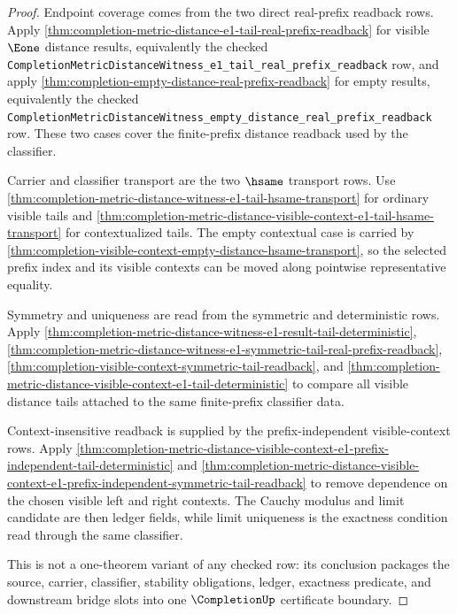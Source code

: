 \begin{proof}
Endpoint coverage comes from the two direct real-prefix readback rows. Apply
\autoref{thm:completion-metric-distance-e1-tail-real-prefix-readback} for visible
$\Eone$ distance results, equivalently the checked
\texttt{CompletionMetricDistanceWitness\_e1\_tail\_real\_prefix\_readback} row, and
apply \autoref{thm:completion-empty-distance-real-prefix-readback} for empty results,
equivalently the checked
\texttt{CompletionMetricDistanceWitness\_empty\_distance\_real\_prefix\_readback} row.
These two cases cover the finite-prefix distance readback used by the classifier.

Carrier and classifier transport are the two $\hsame$ transport rows. Use
\autoref{thm:completion-metric-distance-witness-e1-tail-hsame-transport} for ordinary
visible tails and \autoref{thm:completion-metric-distance-visible-context-e1-tail-hsame-transport}
for contextualized tails. The empty contextual case is carried by
\autoref{thm:completion-visible-context-empty-distance-hsame-transport}, so the selected
prefix index and its visible contexts can be moved along pointwise representative equality.

Symmetry and uniqueness are read from the symmetric and deterministic rows. Apply
\autoref{thm:completion-metric-distance-witness-e1-result-tail-deterministic},
\autoref{thm:completion-metric-distance-witness-e1-symmetric-tail-real-prefix-readback},
\autoref{thm:completion-visible-context-symmetric-tail-readback}, and
\autoref{thm:completion-metric-distance-visible-context-e1-tail-deterministic} to compare
all visible distance tails attached to the same finite-prefix classifier data.

Context-insensitive readback is supplied by the prefix-independent visible-context rows.
Apply \autoref{thm:completion-metric-distance-visible-context-e1-prefix-independent-tail-deterministic}
and \autoref{thm:completion-metric-distance-visible-context-e1-prefix-independent-symmetric-tail-readback}
to remove dependence on the chosen visible left and right contexts. The Cauchy modulus and
limit candidate are then ledger fields, while limit uniqueness is the exactness condition
read through the same classifier.

This is not a one-theorem variant of any checked row: its conclusion packages the source,
carrier, classifier, stability obligations, ledger, exactness predicate, and downstream
bridge slots into one $\CompletionUp$ certificate boundary.
\end{proof}

